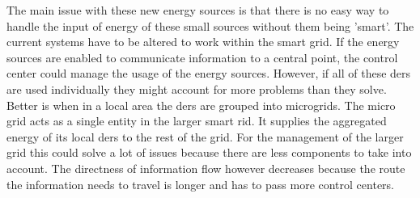 The main issue with these new energy sources is that there is no easy way to handle the input of energy of these small sources without them being 'smart'. The current systems have to be altered to work within the smart grid. If the energy sources are enabled to communicate information to a central point, the control center could manage the usage of the energy sources. However, if all of these \glspl{der} are used individually they might account for more problems than they solve. Better is when in a local area the \glspl{der} are grouped into microgrids. The micro grid acts as a single entity in the larger smart rid. It supplies the aggregated energy of its local \glspl{der} to the rest of the grid. For the management of the larger grid this could solve a lot of issues because there are less components to take into account. The directness of information flow however decreases because the route the information needs to travel is longer and has to pass more control centers. 